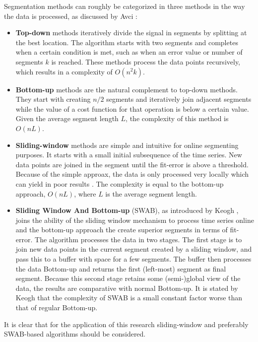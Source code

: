 Segmentation methods can roughly be categorized in three methods in the way the data is processed, as discussed by Avci \etal \cite{avci2010activity}:
\begin{itemize}
  \item \textbf{Top-down} methods iteratively divide the signal in segments by splitting at the best location.
  The algorithm starts with two segments and completes when a certain condition is met, such as when an error value or number of segments $k$ is reached.
  These methods process the data points recursively, which results in a complexity of $O(n^2k)$.
  \item \textbf{Bottom-up} methods are the natural complement to top-down methods.
  They start with creating $n/2$ segments and iteratively join adjacent segments while the value of a cost function for that operation is below a certain value.
  Given the average segment length $L$, the complexity of this method is $O(nL)$.
  \item \textbf{Sliding-window} methods are simple and intuitive for online segmenting purposes.
  It starts with a small initial subsequence of the time series.
  New data points are joined in the segment until the fit-error is above a threshold.
  Because of the simple approax, the data is only processed very locally which can yield in poor results \cite{keogh2001online}.
  The complexity is equal to the bottom-up approach, $O(nL)$, where $L$ is the average segment length.
  \item \textbf{Sliding Window And Bottom-up} (SWAB), as introduced by Keogh \etal \cite{keogh2001online}, joins the ability of the sliding window mechanism to process time series online and the bottom-up approach the create superior segments in terms of fit-error.
  The algorithm processes the data in two stages.
  The first stage is to join new data points in the current segment created by a sliding window, and pass this to a buffer with space for a few segments.
  The buffer then processes the data Bottom-up and returns the first (left-most) segment as final segment.
  Because this second stage retains some (semi-)global view of the data, the results are comparative with normal Bottom-up.
  It is stated by Keogh \etal that the complexity of SWAB is a small constant factor worse than that of regular Bottom-up.
\end{itemize}
It is clear that for the application of this research sliding-window and preferably SWAB-based algorithms should be considered.

